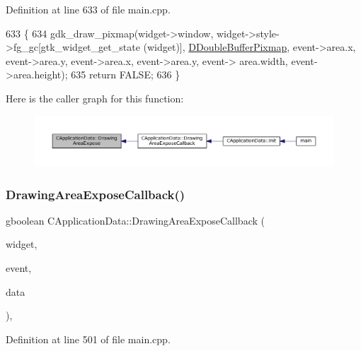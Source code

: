 Definition at line 633 of file main.\+cpp.


\begin{DoxyCode}
633                                                                                     \{
634     gdk\_draw\_pixmap(widget->window, widget->style->fg\_gc[gtk\_widget\_get\_state (widget)], 
      \hyperlink{classCApplicationData_aefb64ec5ca3f791f6d431cfc56b9f3b3}{DDoubleBufferPixmap}, event->area.x, event->area.y, event->area.x, event->area.y, event->
      area.width, event->area.height);
635     \textcolor{keywordflow}{return} FALSE;
636 \}
\end{DoxyCode}
Here is the caller graph for this function\+:\nopagebreak
\begin{figure}[H]
\begin{center}
\leavevmode
\includegraphics[width=350pt]{classCApplicationData_ae998e896194920e08f69f321f3bc9500_icgraph}
\end{center}
\end{figure}
\hypertarget{classCApplicationData_af2ec09e61420f6c493d7ef25e4a7bd11}{}\label{classCApplicationData_af2ec09e61420f6c493d7ef25e4a7bd11} 
\subsubsection{\texorpdfstring{Drawing\+Area\+Expose\+Callback()}{DrawingAreaExposeCallback()}}
{\footnotesize\ttfamily gboolean C\+Application\+Data\+::\+Drawing\+Area\+Expose\+Callback (\begin{DoxyParamCaption}\item[{Gtk\+Widget $\ast$}]{widget,  }\item[{Gdk\+Event\+Expose $\ast$}]{event,  }\item[{gpointer}]{data }\end{DoxyParamCaption})\hspace{0.3cm}{\ttfamily [static]}, {\ttfamily [protected]}}



Definition at line 501 of file main.\+cpp.


